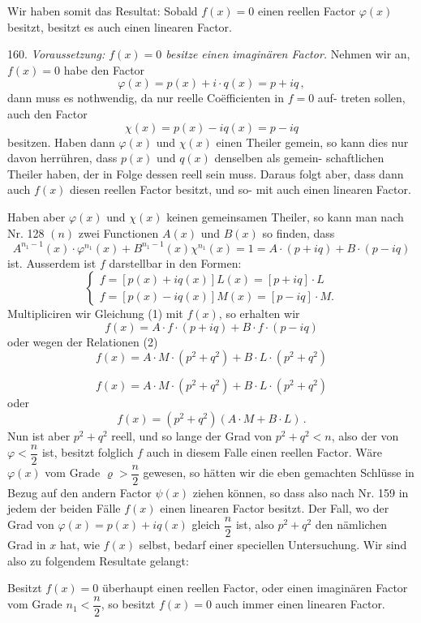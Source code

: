 \documentclass[11pt]{article}
\providecommand{\weberpage}[1]{}
\providecommand{\weq}[2]{\begin{equation}\tag{#1}#2\end{equation}}
\begin{document}
Wir haben somit das Resultat: Sobald $f(x)=0$ einen reellen
Factor $\varphi(x)$ besitzt, besitzt es auch einen linearen Factor.

160. \emph{Voraussetzung: $f(x)=0$ besitze einen imaginären Factor.}
Nehmen wir an, $f(x)=0$ habe den Factor
\[ \varphi(x) = p(x)+i\cdot q(x) = p+iq\, , \]
dann muss es nothwendig, da nur reelle Co\"efficienten in $f=0$ auf-
treten sollen, auch den Factor
\[ \chi(x) = p(x)-iq(x) = p-iq \]
besitzen. Haben dann $\varphi(x)$ und $\chi(x)$ einen Theiler gemein, so kann
dies nur davon herrühren, dass $p(x)$ und $q(x)$ denselben als gemein-
schaftlichen Theiler haben, der in Folge dessen reell sein muss. Daraus
folgt aber, dass dann auch $f(x)$ diesen reellen Factor besitzt, und so-
mit auch einen linearen Factor.

Haben aber $\varphi(x)$ und $\chi(x)$ keinen gemeinsamen Theiler, so kann
man nach Nr. 128 $(n)$ zwei Functionen $A(x)$ und $B(x)$ so finden, dass
\weq{1}{A^{n_1-1}(x)\cdot \varphi^{n_1}(x) + B^{n_1-1}(x)\chi^{n_1}(x) = 1 = A\cdot(p+iq)+B\cdot(p-iq)}
ist. Ausserdem ist $f$ darstellbar in den Formen:
\weq{2}{\begin{cases} f = [p(x)+iq(x)]L(x) = [p+iq]\cdot L \\ f = [p(x)-iq(x)]M(x) = [p-iq]\cdot M. \end{cases}}
Multipliciren wir Gleichung (1) mit $f(x)$, so erhalten wir
\[ f(x) = A\cdot f\cdot(p+iq) + B\cdot f\cdot(p-iq) \]
oder wegen der Relationen (2)
\[ f(x) = A\cdot M\cdot(p^2+q^2) + B\cdot L\cdot(p^2+q^2) \]


\weberpage{170}
\[ f(x) = A\cdot M\cdot(p^2+q^2) + B\cdot L\cdot(p^2+q^2) \]
oder
\[ f(x) = (p^2+q^2)(A\cdot M + B\cdot L)\, . \]
Nun ist aber $p^2+q^2$ reell, und so lange der Grad von $p^2+q^2<n$,
also der von $\varphi<\dfrac{n}{2}$ ist, besitzt folglich $f$ auch in diesem Falle einen
reellen Factor. Wäre $\varphi(x)$ vom Grade $\varrho>\dfrac{n}{2}$ gewesen, so hätten wir
die eben gemachten Schlüsse in Bezug auf den andern Factor $\psi(x)$
ziehen können, so dass also nach Nr. 159 in jedem der beiden Fälle
$f(x)$ einen linearen Factor besitzt. Der Fall, wo der Grad von
$\varphi(x)=p(x)+iq(x)$ gleich $\dfrac{n}{2}$ ist, also $p^2+q^2$ den nämlichen Grad
in $x$ hat, wie $f(x)$ selbst, bedarf einer speciellen Untersuchung. Wir
sind also zu folgendem Resultate gelangt:

\glqq Besitzt $f(x)=0$ überhaupt einen reellen Factor, oder einen
imaginären Factor vom Grade $n_1<\dfrac{n}{2}$, so besitzt $f(x)=0$
auch immer einen linearen Factor.\grqq{}
\end{document}
